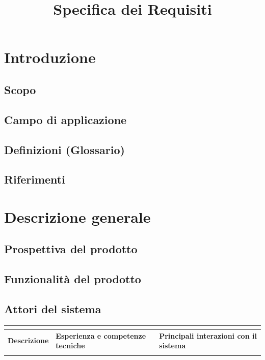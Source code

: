 \documentclass[italian,11pt,a4paper]{article}
\title{Specifica dei Requisiti}
\author{}
\date{}
\begin{document}
\maketitle
\tableofcontents
\newpage

\section{Introduzione}
\subsection{Scopo}

\subsection{Campo di applicazione}

\subsection{Definizioni (Glossario)}

\subsection{Riferimenti}

\newpage
\section{Descrizione generale}
\subsection{Prospettiva del prodotto}

\subsection{Funzionalità del prodotto}

\subsection{Attori del sistema}
\begin{table}[H]\centering
\begin{tabularx}{\textwidth}{|p{3.5cm}|X|X|}\hline
\multicolumn{3}{|c|}{\textbf{}}\\\hline
\textbf{Descrizione} & \textbf{Esperienza e competenze tecniche} & \textbf{Principali interazioni con il sistema}\\\hline
 & & \\\hline
\end{tabularx}
\end{table}
\end{document}
